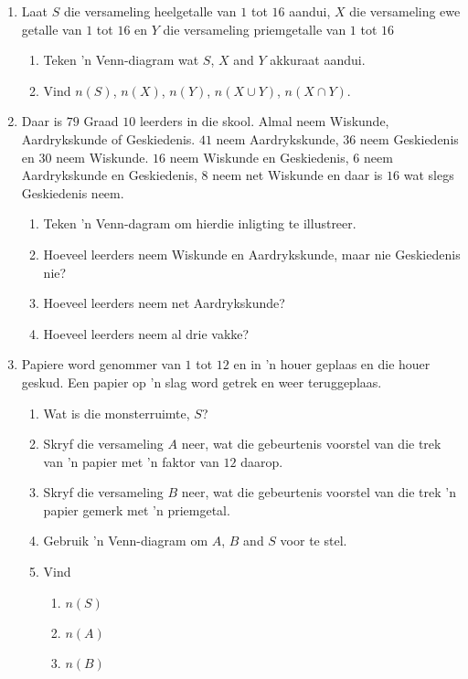 \begin{exercises}{}
{
  \begin{enumerate}[itemsep=5pt, label=\textbf{\arabic*}.]
  \item  Laat $S$ die versameling heelgetalle van $1$ tot $16$ aandui, $X$
    die versameling ewe getalle van $1$ tot $16$ en $Y$ die versameling priemgetalle van $1$ tot $16$
    \begin{enumerate}[noitemsep, label=\textbf{(\alph*)} ]
    \item Teken 'n Venn-diagram wat $S$, $X$ and $Y$ akkuraat aandui.
    \item Vind $n\left(S\right)$, $n\left(X\right)$, $n\left(Y\right)$,
      $n\left(X\cup Y\right)$, $n\left(X\cap Y\right)$.
    \end{enumerate}
  \item Daar is $79$ Graad $10$ leerders in die skool. Almal neem Wiskunde, Aardrykskunde of Geskiedenis. $41$ neem Aardrykskunde, $36$ neem Geskiedenis en $30$ neem Wiskunde. $16$ neem Wiskunde en Geskiedenis, $6$ neem Aardrykskunde en Geskiedenis, $8$ neem net Wiskunde en daar is $16$ wat slegs Geskiedenis neem.
    \begin{enumerate}[noitemsep, label=\textbf{(\alph*)} ]
    \item Teken 'n Venn-dagram om hierdie inligting te illustreer.
    \item Hoeveel leerders neem Wiskunde en Aardrykskunde, maar nie Geskiedenis nie?
    \item Hoeveel leerders neem net Aardrykskunde?
    \item Hoeveel leerders neem al drie vakke?
    \end{enumerate}
  \item Papiere word genommer van $1$ tot $12$ en in 'n houer geplaas en die houer geskud. Een papier op 'n slag word getrek en weer teruggeplaas.
    \begin{enumerate}[noitemsep, label=\textbf{(\alph*)} ]
    \item Wat is die monsterruimte, $S$?
    \item Skryf die versameling $A$ neer, wat die gebeurtenis voorstel van die trek van 'n papier met 'n faktor van $12$ daarop.
    \item Skryf die versameling $B$ neer, wat die gebeurtenis voorstel van die trek 'n papier gemerk met 'n priemgetal.
    \item Gebruik 'n Venn-diagram om $A$, $B$ and $S$ voor te stel.
    \item Vind
      \begin{enumerate}[noitemsep, label=\textbf{\roman*.} ]
      \item $n\left(S\right)$
      \item $n\left(A\right)$
      \item $n\left(B\right)$


\end{enumerate}
\end{enumerate}
\end{enumerate}}
\end{exercises}
